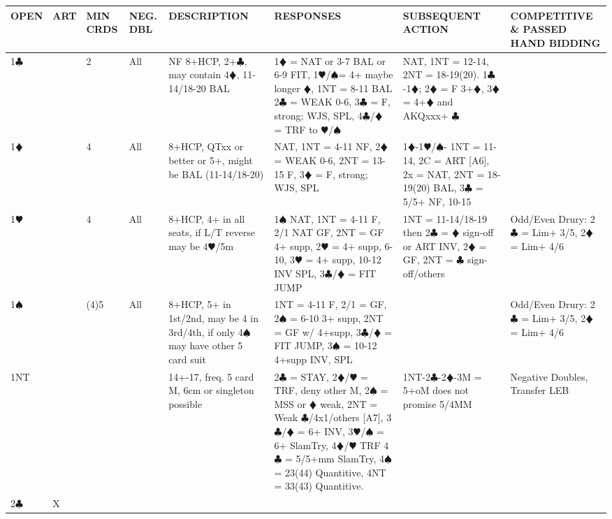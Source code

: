\documentclass{article}
\newcommand\C{\ensuremath{\clubsuit}}
\newcommand\D{\color{red}\ensuremath{\vardiamondsuit}}
\renewcommand\H{\color{red}\ensuremath{\varheartsuit}}
\renewcommand\S{\ensuremath{\spadesuit}}
\newcommand\N{{\footnotesize NT}}
\begin{document}
\noindent
\begin{tabular}{| p{9mm} | p{6mm} | p{6mm} | p{6mm} | p{58mm} | p{62mm} | p{58mm} | p{48mm} |}
	\hline
	\cellcolor{green!25} \textbf{OPEN} & \cellcolor{green!25} \textbf{ART} & \cellcolor{green!25} \textbf{MIN CRDS} & \cellcolor{green!25} \textbf{NEG. DBL} & \cellcolor{green!25} \textbf{DESCRIPTION} & \cellcolor{green!25} \textbf{RESPONSES} & \cellcolor{green!25} \textbf{SUBSEQUENT ACTION} & \cellcolor{green!25} \textbf{COMPETITIVE \& PASSED HAND BIDDING} \\ \hline
	1\C & & 2 & All
			& NF 8+HCP, 2+{\C}, may contain 4{\D}, 11-14/18-20 BAL
			& 1{\D} = NAT or 3-7 BAL or 6-9 FIT, 1{\H}/{\S}= 4+ maybe longer {\D}, 1NT = 8-11 BAL 
			  2{\C} = WEAK 0-6, 3{\C} = F, strong; WJS, SPL, 4{\C}/{\D} = TRF to {\H}/{\S}
			& NAT, 1NT = 12-14, 2NT = 18-19(20). 1{\C}-1{\D}; 2{\D} = F 3+{\D}, 3{\D} = 4+{\D} and AKQxxx+ {\C}
			& \\ \hline
	1\D & & 4 & All 
			& 8+HCP, QTxx or better or 5+, might be BAL (11-14/18-20)  
			& NAT, 1NT = 4-11 NF, 2{\D} = WEAK 0-6, 2{\N} = 13-15 F, 3{\D} = F, strong; WJS, SPL
			& 1{\D}-1{\H}/{\S}- 1NT = 11-14, 2C = ART [A6], 2x = NAT, 2NT = 18-19(20) BAL, 3{\C} = 5/5+ NF, 10-15 & \\ \hline
	1\H & & 4 & All 
			& 8+HCP, 4+ in all seats, if L/T reverse may be 4{\H}/5m
			& 1{\S} NAT, 1NT = 4-11 F, 2/1 NAT GF, 2NT = GF 4+ supp, 2{\H} = 4+ supp, 6-10, 3{\H} = 4+ supp, 10-12 INV 
			SPL, 3{\C}/{\D} = FIT JUMP
			& 1NT = 11-14/18-19 then 2{\C} = {\D} sign-off or ART INV, 2{\D} = GF, 2NT = {\C} sign-off/others
			& Odd/Even Drury: 2{\C} = Lim+ 3/5, 2{\D} = Lim+ 4/6\\ \hline
	1\S & & (4)5 & All 
			& 8+HCP, 5+ in 1st/2nd, may be 4 in 3rd/4th, if only 4{\S} may have other 5 card suit 
			& 1NT = 4-11 F, 2/1 = GF, 2{\S} = 6-10 3+ supp,
			2NT = GF w/ 4+supp, 3{\C}/{\D} = FIT JUMP, 3{\S} = 10-12 4+supp INV, SPL
			& 
			& Odd/Even Drury: 2{\C} = Lim+ 3/5, 2{\D} = Lim+ 4/6\\ \hline
	1\N & & & & 14+-17, freq. 5 card M, 6cm or singleton possible 
			& 2{\C} = STAY, 2{\D}/{\H} = TRF, deny other M, 2{\S} = MSS or {\D} weak, 2{\N} = Weak {\C}/4x1/others [A7], 3{\C}/{\D} = 6+ INV, 3{\H}/{\S} = 6+ SlamTry, 4{\D}/{\H} TRF
			4{\C} = 5/5+mm SlamTry, 4{\S} = 23(44) Quantitive, 4{\N} = 33(43) Quantitive.
			& 1{\N}-2{\C}-2{\D}-3M = 5+oM does not promise 5/4MM
			& Negative Doubles, Transfer LEB\\ \hline
	2\C & X & & 

\end{tabular}
\end{document}
